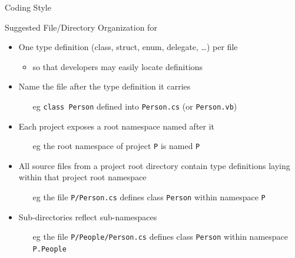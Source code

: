 \documentclass[presentation]{beamer}
\begin{document}
\begin{frame}[allowframebreaks]{\csharp Coding Style}
    \begin{exampleblock}{Suggested File/Directory Organization for \dotnet}
        \begin{itemize}
            \item One type definition (class, struct, enum, delegate, \ldots) per file
            \begin{itemize}
                \item so that developers may easily locate definitions
            \end{itemize}
            \item Name the file after the type definition it carries
            \begin{itemize}
                \item[eg] \texttt{class Person} defined into \texttt{Person.cs} (or \texttt{Person.vb})
            \end{itemize}
            \item Each project exposes a \alert{root namespace} named after it
            \begin{itemize}
                \item[eg] the root namespace of project \texttt{P} is named \texttt{P}
            \end{itemize}
            \item All source files from a project root directory contain type definitions laying within that project root namespace
            \begin{itemize}
                \item[eg] the file \texttt{P/Person.cs} defines class \texttt{Person} within namespace \texttt{P}
            \end{itemize}
            \item Sub-directories reflect sub-namespaces
            \begin{itemize}
                \item[eg] the file \texttt{P/People/Person.cs} defines class \texttt{Person} within namespace \texttt{P.People}
            \end{itemize}
        \end{itemize}
    \end{exampleblock}

\end{frame}
\end{document}
